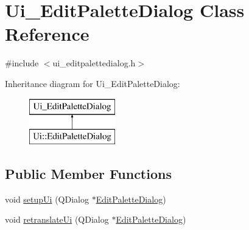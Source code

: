 \hypertarget{class_ui___edit_palette_dialog}{}\section{Ui\+\_\+\+Edit\+Palette\+Dialog Class Reference}
\label{class_ui___edit_palette_dialog}


{\ttfamily \#include $<$ui\+\_\+editpalettedialog.\+h$>$}

Inheritance diagram for Ui\+\_\+\+Edit\+Palette\+Dialog\+:\begin{figure}[H]
\begin{center}
\leavevmode
\includegraphics[height=2.000000cm]{d5/d60/class_ui___edit_palette_dialog}
\end{center}
\end{figure}
\subsection*{Public Member Functions}
\begin{DoxyCompactItemize}
\item 
void \mbox{\hyperlink{class_ui___edit_palette_dialog_afe5ba2f1fdfa4f5edc88c309d3ca1aad}{setup\+Ui}} (Q\+Dialog $\ast$\mbox{\hyperlink{class_edit_palette_dialog}{Edit\+Palette\+Dialog}})
\item 
void \mbox{\hyperlink{class_ui___edit_palette_dialog_a8926a59f5f1bf58a55282dd61c915278}{retranslate\+Ui}} (Q\+Dialog $\ast$\mbox{\hyperlink{class_edit_palette_dialog}{Edit\+Palette\+Dialog}})
\end{DoxyCompactItemize}
